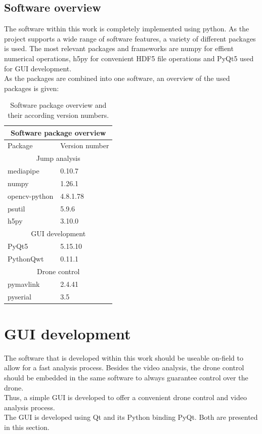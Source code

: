 \subsection{Software overview}\label{subsec:3_versions}
The software within this work is completely implemented using python.
As the project supports a wide range of software features, a variety of
different packages is used.
The most relevant packages and frameworks are numpy for effient numerical
operations, h5py for convenient HDF5 file operations and PyQt5 used for
\ac{GUI} development.\\
As the packages are combined into one software, an overview of the used
packages is given:

\begin{table}[h!]
    \centering
    \begin{tabular}[c]{|p{6cm}|p{6cm}|}
    \hline
    \multicolumn{2}{|c|}{\cellcolor{gray!20}Software package overview}\\
    \hline
    Package & Version number\\
    \hline
    \hline
    \multicolumn{2}{|c|}{\cellcolor{cyan!15}Jump analysis}\\
    \hline
    mediapipe & 0.10.7\\
    \hline
    numpy & 1.26.1\\
    \hline
    opencv-python & 4.8.1.78\\
    \hline
    psutil & 5.9.6\\ 
    \hline
    h5py & 3.10.0\\
    \hline
    \multicolumn{2}{|c|}{\cellcolor{cyan!15}\acs*{GUI} development}\\
    \hline
    PyQt5 & 5.15.10\\
    \hline
    PythonQwt & 0.11.1\\
    \hline
    \multicolumn{2}{|c|}{\cellcolor{cyan!15}Drone control}\\
    \hline
    pymavlink & 2.4.41\\
    \hline
    pyserial & 3.5\\
    \hline
    \end{tabular}
    \caption[Software overview]{Software package overview and their according
    version numbers.}
    \label{table:3_software_overview_version_num}
\end{table}

\section{\acs*{GUI} development}
The software that is developed within this work should be useable on-field to
allow for a fast analysis process.
Besides the video analysis, the drone control should be embedded in the same 
software to always guarantee control over the drone.\\
Thus, a simple \ac{GUI} is developed to offer a convenient drone control and 
video analysis process.\\
The \ac{GUI} is developed using Qt and its Python binding PyQt.
Both are presented in this section. 

